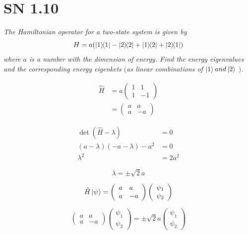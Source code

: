 \documentclass{article}
\begin{document}
\newpage
\section{SN 1.10}
\textit{The Hamiltonian operator for a two-state system is given by
$$
H=a(\ketbra{1}{1}-\ketbra{2}{2}+\ketbra{1}{2}+\ketbra{2}{1})
$$
where $a$ is a number with the dimension of energy. Find the energy eigenvalues and the corresponding energy eigenkets $($as linear combinations of $\ket{1} and \ket{2}$ $)$.}


\begin{align*}
    \hat{H}&=a\left(\begin{array}{ll}
        1 & 1 \\
        1 & -1
        \end{array}\right)\\
    &= \left(\begin{array}{ll}
        a & a \\
        a & -a
        \end{array}\right)
\end{align*}

\begin{align*}
    \operatorname{det}(\hat{H}-\lambda)&=0\\
    (a-\lambda)(-a-\lambda)-a^{2}&=0\\
    \lambda^{2}&=2 a^{2}
\end{align*}

$$\boxed{\lambda=\pm \sqrt{2} a}$$

\begin{equation*}
        \hat{H} \ket{\psi}=\left(\begin{array}{ll}
        a & a \\
        a & -a
        \end{array}\right)\left(\begin{array}{l}
        \psi_1 \\
        \psi_{2}
        \end{array}\right)
\end{equation*}


\begin{equation*}
        \left(\begin{array}{ll}
        a & a \\
        a & -a
        \end{array}\right)\left(\begin{array}{l}
        \psi_1 \\
        \psi_{2}
        \end{array}\right) = \pm \sqrt{2} a \left(\begin{array}{l}
        \psi_1 \\
        \psi_{2}
        \end{array}\right)
\end{equation*}
\end{document}
